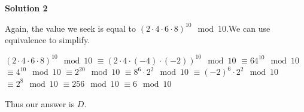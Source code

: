 \begin{enumerate}
 



\textbf{Solution 2}

Again, the value we seek is equal to $(2\cdot 4\cdot 6\cdot 8)^{10}\mod 10$.We can use equivalence to simplify.

 $(2\cdot 4\cdot 6\cdot 8)^{10}\mod 10$
$\equiv (2\cdot 4\cdot (-4)\cdot (-2))^{10} \mod 10$
$\equiv 64^{10} \mod 10$
$\equiv 4^{10} \mod 10$
$\equiv 2^{20} \mod 10$
$\equiv 8^6\cdot 2^2 \mod 10$
$\equiv (-2)^6\cdot 2^2 \mod 10$
$\equiv 2^8 \mod 10$
$\equiv 256 \mod 10$
$\equiv 6 \mod 10$

 Thus our answer is $\boxed{D}$.

 


\end{enumerate}